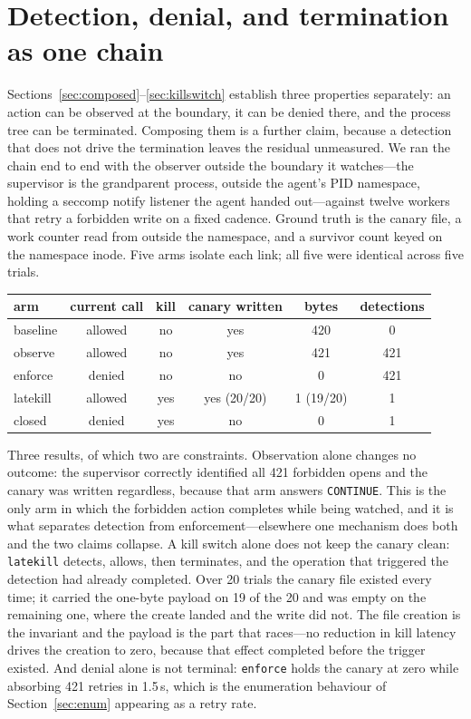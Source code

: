 \documentclass[11pt]{article}
\begin{document}
\section{Detection, denial, and termination as one chain}\label{sec:closedloop}

Sections~\ref{sec:composed}--\ref{sec:killswitch} establish three properties separately: an action can be
observed at the boundary, it can be denied there, and the process tree can be terminated. Composing them
is a further claim, because a detection that does not drive the termination leaves the residual
unmeasured. We ran the chain end to end with the observer outside the boundary it watches---the
supervisor is the grandparent process, outside the agent's PID namespace, holding a seccomp notify
listener the agent handed out---against twelve workers that retry a forbidden write on a fixed cadence.
Ground truth is the canary file, a work counter read from outside the namespace, and a survivor count
keyed on the namespace inode. Five arms isolate each link; all five were identical across five trials.

\begin{center}
\begin{tabular}{lccccc}
\toprule
arm & current call & kill & canary written & bytes & detections \\
\midrule
baseline & allowed & no & yes & 420 & 0 \\
observe & allowed & no & yes & 421 & 421 \\
enforce & denied & no & no & 0 & 421 \\
latekill & allowed & yes & yes (20/20) & 1 (19/20) & 1 \\
closed & denied & yes & no & 0 & 1 \\
\bottomrule
\end{tabular}
\end{center}

Three results, of which two are constraints. Observation alone changes no outcome: the supervisor
correctly identified all 421 forbidden opens and the canary was written regardless, because that arm
answers \texttt{CONTINUE}. This is the only arm in which the forbidden action completes while being
watched, and it is what separates detection from enforcement---elsewhere one mechanism does both and the
two claims collapse. A kill switch alone does not keep the canary clean: \texttt{latekill} detects,
allows, then terminates, and the operation that triggered the detection had already completed. Over 20
trials the canary file existed every time; it carried the one-byte payload on 19 of the 20 and was empty
on the remaining one, where the create landed and the write did not. The file creation is the invariant
and the payload is the part that races---no reduction in kill latency drives the creation to zero,
because that effect completed before the trigger existed. And denial alone is not terminal: \texttt{enforce} holds the canary at
zero while absorbing 421 retries in 1.5\,s, which is the enumeration behaviour of Section~\ref{sec:enum}
appearing as a retry rate.
\end{document}
